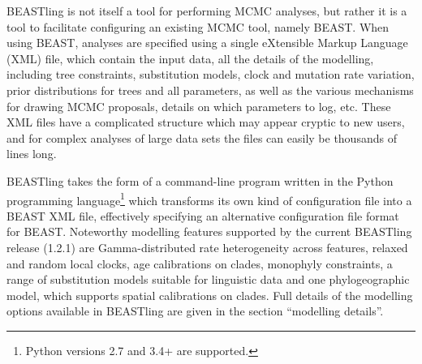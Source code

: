 \documentclass[twocolumn,10pt]{scrartcl}
\begin{document}
BEASTling is not itself a tool for performing MCMC analyses, but rather it is a tool to facilitate configuring an existing MCMC tool, namely BEAST.  When using BEAST, analyses are specified using a single eXtensible Markup Language (XML) file, which contain the input data, all the details of the modelling, including tree constraints, substitution models, clock and mutation rate variation, prior distributions for trees and all parameters, as well as the various mechanisms for drawing MCMC proposals, details on which parameters to log, etc.  These XML files have a complicated structure which may appear cryptic to new users, and for complex analyses of large data sets the files can easily be thousands of lines long.

BEASTling takes the form of a command-line program written in the Python programming language\footnote{Python versions 2.7 and 3.4+ are supported.} which transforms its own kind of configuration file into a BEAST XML file, effectively specifying an alternative configuration file format for BEAST. Noteworthy modelling features supported by the current BEASTling release (1.2.1) are Gamma-distributed rate heterogeneity across features, relaxed and random local clocks, age calibrations on clades, monophyly constraints, a range of substitution models suitable for linguistic data and one phylogeographic model, which supports spatial calibrations on clades.  Full details of the modelling options available in BEASTling are given in the section ``modelling details''.
\end{document}
